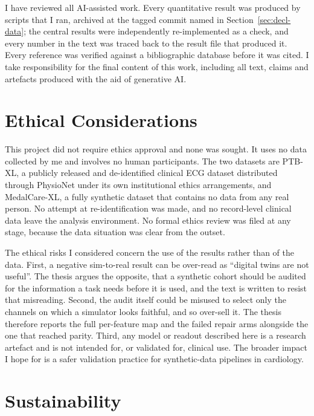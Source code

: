 I have reviewed all AI-assisted work. Every quantitative result was produced by scripts that I ran, archived at the tagged commit named in Section~\ref{sec:decl-data}; the central results were independently re-implemented as a check, and every number in the text was traced back to the result file that produced it. Every reference was verified against a bibliographic database before it was cited. I take responsibility for the final content of this work, including all text, claims and artefacts produced with the aid of generative AI.

\section{Ethical Considerations}
\label{sec:decl-ethics}

This project did not require ethics approval and none was sought. It uses no data collected by me and involves no human participants. The two datasets are PTB-XL, a publicly released and de-identified clinical ECG dataset distributed through PhysioNet under its own institutional ethics arrangements, and MedalCare-XL, a fully synthetic dataset that contains no data from any real person. No attempt at re-identification was made, and no record-level clinical data leave the analysis environment. No formal ethics review was filed at any stage, because the data situation was clear from the outset.

The ethical risks I considered concern the use of the results rather than of the data. First, a negative sim-to-real result can be over-read as ``digital twins are not useful''. The thesis argues the opposite, that a synthetic cohort should be audited for the information a task needs before it is used, and the text is written to resist that misreading. Second, the audit itself could be misused to select only the channels on which a simulator looks faithful, and so over-sell it. The thesis therefore reports the full per-feature map and the failed repair arms alongside the one that reached parity. Third, any model or readout described here is a research artefact and is not intended for, or validated for, clinical use. The broader impact I hope for is a safer validation practice for synthetic-data pipelines in cardiology.

\section{Sustainability}
\label{sec:decl-sustain}

